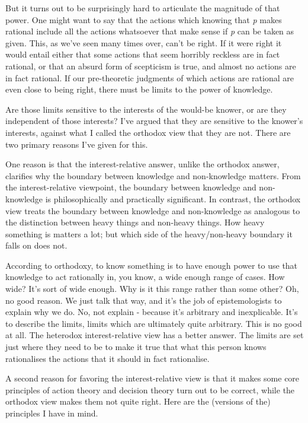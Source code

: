 \documentclass[
  10pt,
  letterpaper,
  twoside]{scrbook}
\begin{document}
But it turns out to be surprisingly hard to articulate the magnitude of
that power. One might want to say that the actions which knowing that
\emph{p} makes rational include all the actions whatsoever that make
sense if \emph{p} can be taken as given. This, as we've seen many times
over, can't be right. If it were right it would entail either that some
actions that seem horribly reckless are in fact rational, or that an
absurd form of scepticism is true, and almost no actions are in fact
rational. If our pre-theoretic judgments of which actions are rational
are even close to being right, there must be limits to the power of
knowledge.

Are those limits sensitive to the interests of the would-be knower, or
are they independent of those interests? I've argued that they are
sensitive to the knower's interests, against what I called the orthodox
view that they are not. There are two primary reasons I've given for
this.

One reason is that the interest-relative answer, unlike the orthodox
answer, clarifies why the boundary between knowledge and non-knowledge
matters. From the interest-relative viewpoint, the boundary between
knowledge and non-knowledge is philosophically and practically
significant. In contrast, the orthodox view treats the boundary between
knowledge and non-knowledge as analogous to the distinction between
heavy things and non-heavy things. How heavy something is matters a lot;
but which side of the heavy/non-heavy boundary it falls on does not.

According to orthodoxy, to know something is to have enough power to use
that knowledge to act rationally in, you know, a wide enough range of
cases. How wide? It's sort of wide enough. Why is it this range rather
than some other? Oh, no good reason. We just talk that way, and it's the
job of epistemologists to explain why we do. No, not explain - because
it's arbitrary and inexplicable. It's to describe the limits, limits
which are ultimately quite arbitrary. This is no good at all. The
heterodox interest-relative view has a better answer. The limits are set
just where they need to be to make it true that what this person knows
rationalises the actions that it should in fact rationalise.

A second reason for favoring the interest-relative view is that it makes
some core principles of action theory and decision theory turn out to be
correct, while the orthodox view makes them not quite right. Here are
the (versions of the) principles I have in mind.
\end{document}
